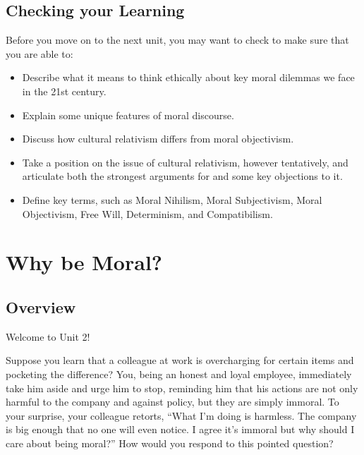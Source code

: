 \documentclass[
]{book}
\providecommand{\tightlist}{%
  \setlength{\itemsep}{0pt}\setlength{\parskip}{0pt}}
\begin{document}
\hypertarget{checking-your-learning}{%
\section*{Checking your Learning}\label{checking-your-learning}}

\begin{progress}
Before you move on to the next unit, you may want to check to make sure that you are able to:

\begin{itemize}
\tightlist
\item
  Describe what it means to think ethically about key moral dilemmas we face in the 21st century.
\item
  Explain some unique features of moral discourse.
\item
  Discuss how cultural relativism differs from moral objectivism.
\item
  Take a position on the issue of cultural relativism, however tentatively, and articulate both the strongest arguments for and some key objections to it.
\item
  Define key terms, such as Moral Nihilism, Moral Subjectivism, Moral Objectivism, Free Will, Determinism, and Compatibilism.
\end{itemize}
\end{progress}

\hypertarget{why-be-moral}{%
\chapter{Why be Moral?}\label{why-be-moral}}

\hypertarget{overview-1}{%
\section*{Overview}\label{overview-1}}

Welcome to Unit 2!

Suppose you learn that a colleague at work is overcharging for certain items and pocketing the difference? You, being an honest and loyal employee, immediately take him aside and urge him to stop, reminding him that his actions are not only harmful to the company and against policy, but they are simply immoral. To your surprise, your colleague retorts, ``What I'm doing is harmless. The company is big enough that no one will even notice. I agree it's immoral but why should I care about being moral?'' How would you respond to this pointed question?
\end{document}
